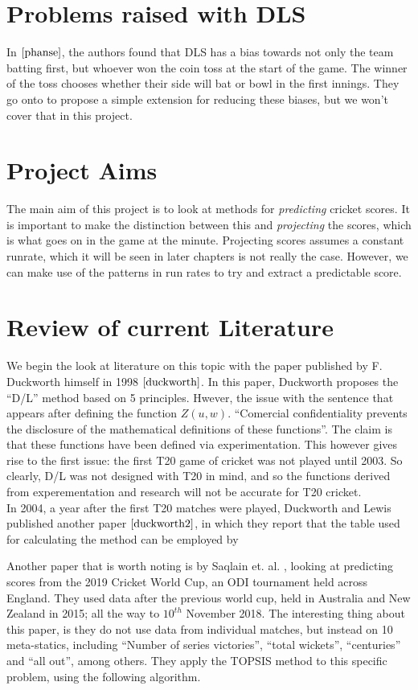 \section{Problems raised with DLS}
In $\cite{phanse}$, the authors found that DLS has a bias towards not only the team batting first, but whoever won the coin toss at the start of the game.
The winner of the toss chooses whether their side will bat or bowl in the first innings. They go onto to propose a simple extension for reducing
these biases, but we won't cover that in this project. 

\section{Project Aims}
The main aim of this project is to look at methods for \textit{predicting} cricket scores. It is important to make the distinction between this 
and \textit{projecting} the scores, which is what goes on in the game at the minute. Projecting scores assumes a constant runrate, which it will be seen 
in later chapters is not really the case. However, we can make use of the patterns in run rates to try and extract a predictable score. 


\section{Review of current Literature}
We begin the look at literature on this topic with the paper published by F. Duckworth himself in 1998 $\cite{duckworth}$. In this paper, 
Duckworth proposes the ``D/L'' method based on 5 principles. Hwever, the issue with the sentence that appears after defining the function $Z(u,w)$.
``Comercial confidentiality prevents the disclosure of the mathematical definitions of these functions''. The claim is that these functions have been 
defined via experimentation. This however gives rise to the first issue: the first T20 game of cricket was not played until 2003. So clearly, D/L was not
designed with T20 in mind, and so the functions derived from experementation and research will not be accurate for T20 cricket. \\

In 2004, a year after the first T20 matches were played, Duckworth and Lewis published another paper $\cite{duckworth2}$, in which they report
that the table used for calculating the method can be employed by 

Another paper that is worth noting is by Saqlain et. al. \cite{saqlain}, looking at predicting scores from the 2019 Cricket World Cup, an ODI
tournament held across England. They used data after the previous world cup, held in Australia and New Zealand in 2015; all the way to $10^{th}$ November
2018. The interesting thing about this paper, is they do not use data from individual matches, but instead on 10 meta-statics, including 
``Number of series victories'', ``total wickets'', ``centuries'' and ``all out'', among others. They apply the TOPSIS method to this specific problem, using the 
following algorithm. \\

